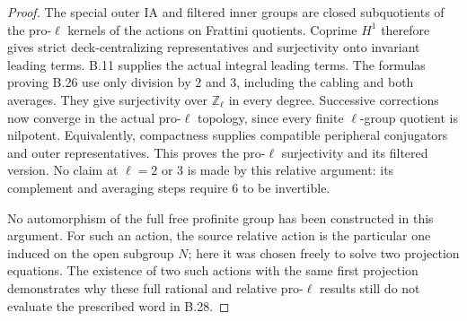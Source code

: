 \begin{proof}
The special outer IA and filtered inner groups are
closed subquotients of the pro-$\ell$ kernels of the
actions on Frattini quotients. Coprime $H^1$ therefore gives
strict deck-centralizing representatives and surjectivity
onto invariant leading terms. B.11 supplies the actual
integral leading terms. The formulas proving B.26 use
only division by $2$ and $3$, including the cabling and
both averages. They give surjectivity over $\mathbb Z_\ell$
in every degree. Successive corrections now converge in
the actual pro-$\ell$ topology, since every finite
$\ell$-group quotient is nilpotent. Equivalently,
compactness supplies compatible peripheral conjugators
and outer representatives. This proves the pro-$\ell$
surjectivity and its filtered version. No claim at
$\ell=2$ or $3$ is made by this relative argument:
its complement and averaging steps require $6$ to be
invertible.

No automorphism of the full free profinite group has been
constructed in this argument. For such an action, the source relative action
is the particular one induced on the open subgroup $N$;
here it was chosen freely to solve two projection equations.
The existence of two such actions with the same first
projection demonstrates why these full rational and relative
pro-$\ell$ results still do not evaluate the prescribed word in B.28.
\end{proof}
